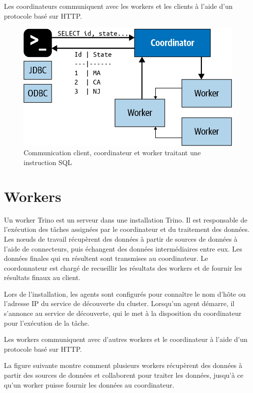 Les coordinateurs communiquent avec les workers et les clients à l'aide d'un protocole basé sur HTTP.
\begin{figure}[htbp]
\centering
\includegraphics[width=\linewidth]{images/trino_communication_processing.png}
\caption{Communication client, coordinateur et worker traitant une instruction SQL}\label{fig:trino-communication-precessing}
\end{figure}

\section{Workers}
Un worker Trino est un serveur dans une installation Trino. Il est responsable de l'exécution des tâches assignées par le coordinateur et du traitement des données. Les nœuds de travail récupèrent des données à partir de sources de données à l'aide de connecteurs, puis échangent des données intermédiaires entre eux. Les données finales qui en résultent sont transmises au coordinateur. Le coordonnateur est chargé de recueillir les résultats des workers et de fournir les résultats finaux au client.

Lors de l'installation, les agents sont configurés pour connaître le nom d'hôte ou l'adresse IP du service de découverte du cluster. Lorsqu'un agent démarre, il s'annonce au service de découverte, qui le met à la disposition du coordinateur pour l'exécution de la tâche.

Les workers communiquent avec d'autres workers et le coordinateur à l'aide d'un protocole basé sur HTTP.

La figure suivante montre comment plusieurs workers récupèrent des données à partir des sources de données et collaborent pour traiter les données, jusqu'à ce qu'un worker puisse fournir les données au coordinateur.

